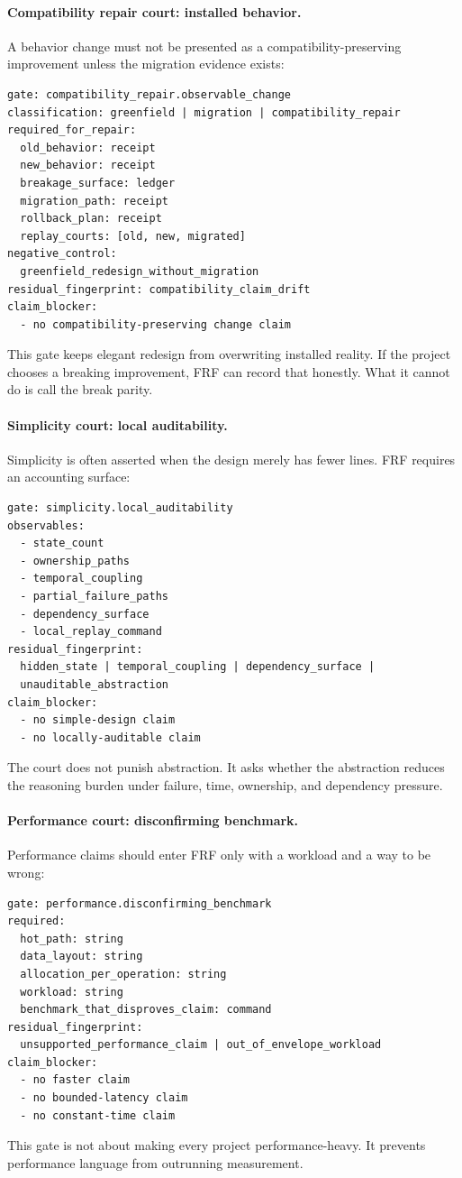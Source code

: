 \documentclass[11pt,a4paper]{article}
\newcommand{\frf}{\textsc{FRF}}
\begin{document}
\paragraph{Compatibility repair court: installed behavior.}
A behavior change must not be presented as a compatibility-preserving improvement unless the migration evidence exists:
\begin{verbatim}
gate: compatibility_repair.observable_change
classification: greenfield | migration | compatibility_repair
required_for_repair:
  old_behavior: receipt
  new_behavior: receipt
  breakage_surface: ledger
  migration_path: receipt
  rollback_plan: receipt
  replay_courts: [old, new, migrated]
negative_control:
  greenfield_redesign_without_migration
residual_fingerprint: compatibility_claim_drift
claim_blocker:
  - no compatibility-preserving change claim
\end{verbatim}
This gate keeps elegant redesign from overwriting installed reality. If the project chooses a breaking improvement, \frf{} can record that honestly. What it cannot do is call the break parity.

\paragraph{Simplicity court: local auditability.}
Simplicity is often asserted when the design merely has fewer lines. \frf{} requires an accounting surface:
\begin{verbatim}
gate: simplicity.local_auditability
observables:
  - state_count
  - ownership_paths
  - temporal_coupling
  - partial_failure_paths
  - dependency_surface
  - local_replay_command
residual_fingerprint:
  hidden_state | temporal_coupling | dependency_surface |
  unauditable_abstraction
claim_blocker:
  - no simple-design claim
  - no locally-auditable claim
\end{verbatim}
The court does not punish abstraction. It asks whether the abstraction reduces the reasoning burden under failure, time, ownership, and dependency pressure.

\paragraph{Performance court: disconfirming benchmark.}
Performance claims should enter \frf{} only with a workload and a way to be wrong:
\begin{verbatim}
gate: performance.disconfirming_benchmark
required:
  hot_path: string
  data_layout: string
  allocation_per_operation: string
  workload: string
  benchmark_that_disproves_claim: command
residual_fingerprint:
  unsupported_performance_claim | out_of_envelope_workload
claim_blocker:
  - no faster claim
  - no bounded-latency claim
  - no constant-time claim
\end{verbatim}
This gate is not about making every project performance-heavy. It prevents performance language from outrunning measurement.
\end{document}
